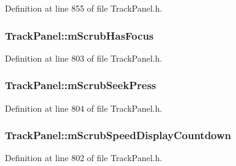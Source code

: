 Definition at line 855 of file Track\+Panel.\+h.

\subsubsection[{\texorpdfstring{m\+Scrub\+Has\+Focus}{mScrubHasFocus}}]{ Track\+Panel\+::m\+Scrub\+Has\+Focus\hspace{0.3cm}{\ttfamily [protected]}}\hypertarget{class_track_panel_ae30f39b53fd3947ccb99b048a6efd4e3}{}\label{class_track_panel_ae30f39b53fd3947ccb99b048a6efd4e3}


Definition at line 803 of file Track\+Panel.\+h.

\subsubsection[{\texorpdfstring{m\+Scrub\+Seek\+Press}{mScrubSeekPress}}]{ Track\+Panel\+::m\+Scrub\+Seek\+Press\hspace{0.3cm}{\ttfamily [protected]}}\hypertarget{class_track_panel_a8082a55b36f3365b1dceefdc77da0067}{}\label{class_track_panel_a8082a55b36f3365b1dceefdc77da0067}


Definition at line 804 of file Track\+Panel.\+h.

\subsubsection[{\texorpdfstring{m\+Scrub\+Speed\+Display\+Countdown}{mScrubSpeedDisplayCountdown}}]{ Track\+Panel\+::m\+Scrub\+Speed\+Display\+Countdown\hspace{0.3cm}{\ttfamily [protected]}}\hypertarget{class_track_panel_af6bc97469446521a9213c76e533d428e}{}\label{class_track_panel_af6bc97469446521a9213c76e533d428e}


Definition at line 802 of file Track\+Panel.\+h.

